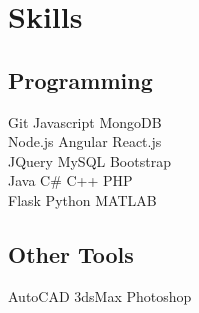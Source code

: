\documentclass[a4paper]{resume}
\begin{document}
\begin{minipage}[t]{0.33\textwidth}
\sectionspace %



\section{Skills}

\subsection{Programming}

Git \textbullet{} Javascript \textbullet{} MongoDB \\
Node.js \textbullet{} Angular \textbullet{} React.js \\
JQuery \textbullet{} MySQL \textbullet{} Bootstrap \\
Java \textbullet{} C\# \textbullet{} C++ \textbullet{} PHP \\
Flask \textbullet{} Python \textbullet{} MATLAB \\

\sectionspace %

\subsection{Other Tools}
AutoCAD \textbullet{} 3dsMax \textbullet{} Photoshop


\end{minipage} %
\hfill
%
%
\end{document}
